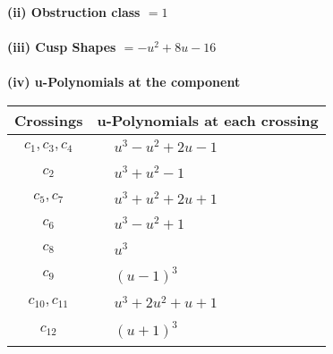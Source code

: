 \documentclass[1p]{elsarticle_modified}
\theoremstyle{definition}
\begin{document}
\flushleft \textbf{(ii) Obstruction class $= 1$}\\~\\
\flushleft \textbf{(iii) Cusp Shapes $= - u^2+8 u-16$}\\~\\
\newpage\renewcommand{\arraystretch}{1}
\flushleft \textbf{(iv) u-Polynomials at the component}\newline \\
\begin{tabular}{m{50pt}|m{274pt}}
Crossings & \hspace{64pt}u-Polynomials at each crossing \\
\hline $$\begin{aligned}c_{1},c_{3},c_{4}\end{aligned}$$&$\begin{aligned}
&u^3- u^2+2 u-1
\end{aligned}$\\
\hline $$\begin{aligned}c_{2}\end{aligned}$$&$\begin{aligned}
&u^3+u^2-1
\end{aligned}$\\
\hline $$\begin{aligned}c_{5},c_{7}\end{aligned}$$&$\begin{aligned}
&u^3+u^2+2 u+1
\end{aligned}$\\
\hline $$\begin{aligned}c_{6}\end{aligned}$$&$\begin{aligned}
&u^3- u^2+1
\end{aligned}$\\
\hline $$\begin{aligned}c_{8}\end{aligned}$$&$\begin{aligned}
&u^3
\end{aligned}$\\
\hline $$\begin{aligned}c_{9}\end{aligned}$$&$\begin{aligned}
&(u-1)^3
\end{aligned}$\\
\hline $$\begin{aligned}c_{10},c_{11}\end{aligned}$$&$\begin{aligned}
&u^3+2 u^2+u+1
\end{aligned}$\\
\hline $$\begin{aligned}c_{12}\end{aligned}$$&$\begin{aligned}
&(u+1)^3
\end{aligned}$\\
\hline
\end{tabular}\\~\\
\end{document}
